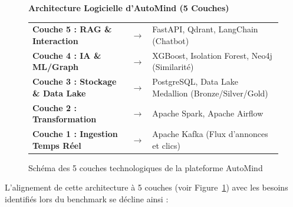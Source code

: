 \documentclass[11pt,a4paper]{article}
\begin{document}
\begin{figure}[htbp]
  \centering
  \begin{tcolorbox}[colback=white, colframe=black!30!white, arc=1mm, width=\textwidth, before={\par\noindent\vspace{10pt}}, after=\vspace{10pt}]
    \centering
    \textbf{Architecture Logicielle d'AutoMind (5 Couches)}\\[0.3cm]
    \begin{tabular}{llp{6.8cm}}
      \textbf{Couche 5 : RAG \& Interaction} & $\rightarrow$ & FastAPI, Qdrant, LangChain (Chatbot) \\
      \textbf{Couche 4 : IA \& ML/Graph} & $\rightarrow$ & XGBoost, Isolation Forest, Neo4j (Similarité) \\
      \textbf{Couche 3 : Stockage \& Data Lake} & $\rightarrow$ & PostgreSQL, Data Lake Medallion (Bronze/Silver/Gold) \\
      \textbf{Couche 2 : Transformation} & $\rightarrow$ & Apache Spark, Apache Airflow \\
      \textbf{Couche 1 : Ingestion Temps Réel} & $\rightarrow$ & Apache Kafka (Flux d'annonces et clics) \\
    \end{tabular}
  \end{tcolorbox}
  \caption{Schéma des 5 couches technologiques de la plateforme AutoMind}
  \label{fig:layers}
\end{figure}

L'alignement de cette architecture à 5 couches (voir Figure~\ref{fig:layers}) avec les besoins identifiés lors du benchmark se décline ainsi :
\end{document}
